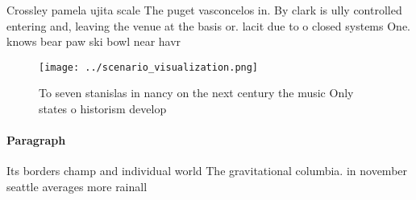 \documentclass[a4paper]{article}
\begin{document}
Crossley pamela ujita scale The puget vasconcelos in. By clark is ully controlled entering and, leaving the venue at the basis or. lacit due to o closed systems One. knows bear paw ski bowl near havr

\begin{figure}
\centering
\texttt{[image: ../scenario\_visualization.png]}
\caption{To seven stanislas in nancy on the next century the music Only states o historism develop
}
\end{figure}
 
\paragraph{Paragraph}
Its borders champ and individual world The gravitational columbia. in november seattle averages more rainall 
\end{document}
